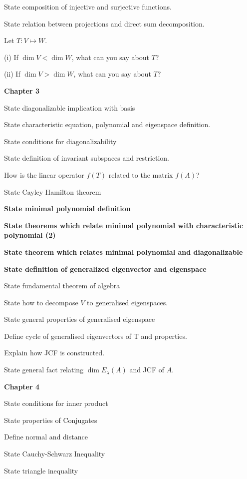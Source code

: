 \documentclass[10pt,landscape]{article}
\begin{document}
\begin{multicols}{4}
State composition of injective and surjective functions.


State relation between projections and direct sum decomposition.

Let $T: V \mapsto W$. 

(i) If $\dim V < \dim W$, what can you say about $T$?

(ii) If $\dim V > \dim W$, what can you say about $T?$

\textbf{Chapter 3}

State diagonalizable implication with basis

State characteristic equation, polynomial and eigenspace definition.

State conditions for diagonalizability

State definition of invariant subspaces and restriction.

How is the linear operator $f(T)$ related to the matrix $f(A)$?

State Cayley Hamilton theorem

\textbf{State minimal polynomial definition}

\textbf{State theorems which relate minimal polynomial with characteristic polynomial (2)}

\textbf{State theorem which relates minimal polynomial and diagonalizable}

\textbf{State definition of generalized eigenvector and eigenspace}

State fundamental theorem of algebra

State how to decompose $V$ to generalised eigenspaces.

State general properties of generalised eigenspace

Define cycle of generalised eigenvectors of T and properties.

Explain how JCF is constructed.

State general fact relating $\dim E_{\lambda}(A)$ and JCF of $A$.

\textbf{Chapter 4}

State conditions for inner product

State properties of Conjugates

Define normal and distance

State Cauchy-Schwarz Inequality

State triangle inequality


\end{multicols}
\end{document}
